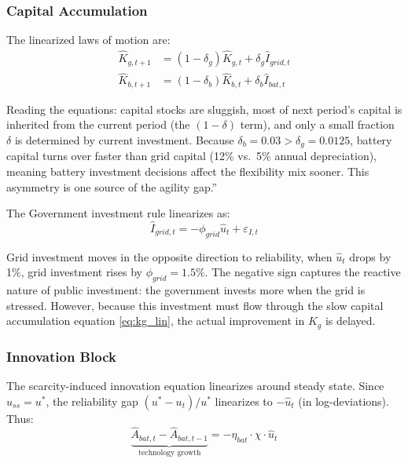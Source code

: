 \documentclass[12pt, a4paper]{article}
\begin{document}
	\subsubsection{Capital Accumulation}
	
	The linearized laws of motion are:
	\begin{align}
		\hat{K}_{g,t+1} &= (1-\delta_g)\hat{K}_{g,t} + \delta_g \hat{I}_{grid,t} \label{eq:kg_lin} \\
		\hat{K}_{b,t+1} &= (1-\delta_b)\hat{K}_{b,t} + \delta_b \hat{I}_{bat,t} \label{eq:kb_lin}
	\end{align}
	
	\noindent Reading the equations: capital stocks are sluggish, most of next period's capital is inherited from the current period (the $(1-\delta)$ term), and only a small fraction $\delta$ is determined by current investment. Because $\delta_b = 0.03 > \delta_g = 0.0125$, battery capital turns over faster than grid capital (12\% vs.\ 5\% annual depreciation), meaning battery investment decisions affect the flexibility mix sooner. This asymmetry is one source of the agility gap.''
	
	The Government investment rule linearizes as:
	\begin{equation}
		\hat{I}_{grid,t} = -\phi_{grid} \hat{u}_t + \varepsilon_{I,t}
		\label{eq:gridrule_lin}
	\end{equation}
	
	Grid investment moves in the opposite direction to reliability, when $\hat{u}_t$ drops by 1\%, grid investment rises by $\phi_{grid} = 1.5$\%. The negative sign captures the reactive nature of public investment: the government invests more when the grid is stressed. However, because this investment must flow through the slow capital accumulation equation \eqref{eq:kg_lin}, the actual improvement in $K_g$ is delayed.
	
	\subsubsection{Innovation Block}
	
	The scarcity-induced innovation equation linearizes around steady state. Since $u_{ss} = u^*$, the reliability gap $(u^* - u_t)/u^*$ linearizes to $-\hat{u}_t$ (in log-deviations). Thus:
	\begin{equation}
		\underbrace{\hat{A}_{bat,t} - \hat{A}_{bat,t-1}}_{\text{technology growth}} = -\eta_{bat} \cdot \chi \cdot \hat{u}_t
		\label{eq:abat_lin}
	\end{equation}
	
\end{document}
